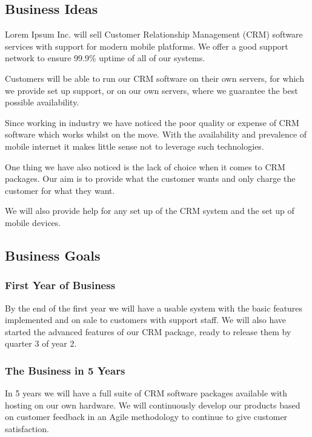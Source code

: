 \documentclass[DIV=calc, paper=a4, fontsize=11pt]{scrartcl}	 %
\begin{document}
\subsection{Business Ideas}
Lorem Ipsum Inc. will sell Customer Relationship Management (CRM) software services with support
for modern mobile platforms. We offer a good support network to ensure 99.9\% uptime of all of our
systems.

Customers will be able to run our CRM software on their own servers, for which we provide set up
support, or on our own servers, where we guarantee the best possible availability.

Since working in industry we have noticed the poor quality or expense of CRM software which works
whilst on the move. With the availability and prevalence of mobile internet it makes little sense
not to leverage such technologies.

One thing we have also noticed is the lack of choice when it comes to CRM packages. Our aim is to
provide what the customer wants and only charge the customer for what they want.

We will also provide help for any set up of the CRM system and the set up of mobile devices.

\subsection{Business Goals}
\subsubsection*{First Year of Business}
By the end of the first year we will have a usable system with the basic features implemented and
on sale to customers with support staff. We will also have started the advanced features of our
CRM package, ready to release them by quarter 3 of year 2. 

\subsubsection*{The Business in 5 Years}
In 5 years we will have a full suite of CRM software packages available with hosting on our own
hardware. We will continuously develop our products based on customer feedback in an Agile 
methodology to continue to give customer satisfaction.
\end{document}
